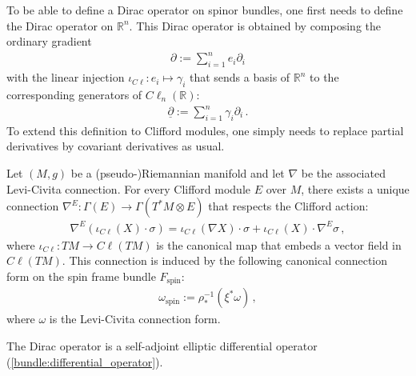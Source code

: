     To be able to define a Dirac operator on spinor bundles, one first needs to define the Dirac operator on $\mathbb{R}^n$. This Dirac operator is obtained by composing the ordinary gradient
    \begin{gather}
        \partial:=\sum_{i=1}^ne_i\partial_i
    \end{gather}
    with the linear injection $\iota_{C\ell}:e_i\mapsto\gamma_i$ that sends a basis of $\mathbb{R}^n$ to the corresponding generators of $C\ell_n(\mathbb{R})$:
    \begin{gather}
        \label{riemann:dirac_operator_R}
        \underline{\partial} := \sum_{i=1}^n\gamma_i\partial_i\,.
    \end{gather}
    To extend this definition to Clifford modules, one simply needs to replace partial derivatives by covariant derivatives as usual.
    \begin{property}
        Let $(M,g)$ be a (pseudo-)Riemannian manifold and let $\nabla$ be the associated Levi-Civita connection. For every Clifford module $E$ over $M$, there exists a unique connection $\nabla^E:\Gamma(E)\rightarrow\Gamma(T^*M\otimes E)$ that respects the Clifford action:
        \begin{gather}
            \nabla^E(\iota_{C\ell}(X)\cdot\sigma) = \iota_{C\ell}(\nabla X)\cdot\sigma + \iota_{C\ell}(X)\cdot\nabla^E\sigma\,,
        \end{gather}
        where $\iota_{C\ell}:TM\rightarrow C\ell(TM)$ is the canonical map that embeds a vector field in $C\ell(TM)$. This connection is induced by the following canonical connection form on the spin frame bundle $F_{\text{spin}}$:
        \begin{gather}
            \omega_{\text{spin}} := \rho^{-1}_*(\xi^*\omega)\,,
        \end{gather}
        where $\omega$ is the Levi-Civita connection form.
    \end{property}

    \begin{property}[Ellipticity]
        The Dirac operator is a self-adjoint elliptic differential operator (\cref{bundle:differential_operator}).
    \end{property}

